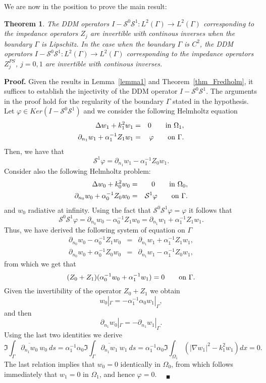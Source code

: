 \documentclass[11pt]{article}
\numberwithin{equation}{section}
\newtheorem{theorem}{Theorem}[section]
\newenvironment{proof}{\hspace{0.5cm} {\bf Proof.}}
{$\quad {}_\blacksquare$\vspace{0.3cm}}
\begin{document}
We are now in the position to prove the main result:
\begin{theorem}\label{thm:wp_DDM}
  The DDM operators $I-\mathcal{S}^0\mathcal{S}^1:L^2(\Gamma)\to L^2(\Gamma)$ corresponding to the impedance operators $Z_j$ are invertible with continous inverses when the boundary $\Gamma$ is Lipschitz. In the case when the boundary $\Gamma$ is $C^2$, the DDM operators $I-\mathcal{S}^0\mathcal{S}^1:L^2(\Gamma)\to L^2(\Gamma)$ corresponding to the impedance operators $Z_j^{PS}$, $j=0,1$ are invertible with continous inverses.
\end{theorem}
\begin{proof}
  Given the results in Lemma~\ref{lemma1} and Theorem~\ref{thm_Fredholm}, it suffices to establish the injectivity of the DDM operator $I-\mathcal{S}^0\mathcal{S}^1$. The arguments in the proof hold for the regularity of the boundary $\Gamma$ stated in the hypothesis. Let $\varphi\in Ker(I-\mathcal{S}^0\mathcal{S}^1)$ and we consider the following Helmholtz equation
  \begin{eqnarray*}
    \Delta w_1+k_1^2w_1&=&0\qquad{\rm in}\ \Omega_1,\\
    \partial_{n_1}w_1+\alpha_1^{-1}Z_1w_1&=&\varphi\qquad{\rm on}\ \Gamma.
  \end{eqnarray*}
  Then, we have that
  \[
  \mathcal{S}^1\varphi=\partial_{n_1}w_1-\alpha_1^{-1}Z_0w_1.
  \]
  Consider also the following Helmholtz problem:
  \begin{eqnarray*}
    \Delta w_0+k_0^2w_0&=&0\qquad{\rm in}\ \Omega_0,\\
    \partial_{n_0}w_0+\alpha_0^{-1}Z_0w_0&=&\mathcal{S}^1\varphi\qquad{\rm on}\ \Gamma.
  \end{eqnarray*}
  and $w_0$ radiative at infinity. Using the fact that $\mathcal{S}^0\mathcal{S}^1\varphi=\varphi$ it  follows that 
  \[
  \mathcal{S}^0\mathcal{S}^1\varphi=\partial_{n_0}w_0-\alpha_0^{-1}Z_1w_0=\partial_{n_1}w_1+\alpha_1^{-1}Z_1w_1.
  \]
  Thus, we have derived the following system of equation on $\Gamma$
  \begin{eqnarray*}
    \partial_{n_0}w_0-\alpha_0^{-1}Z_1w_0&=&\partial_{n_1}w_1+\alpha_1^{-1}Z_1w_1,\\
    \partial_{n_0}w_0+\alpha_0^{-1}Z_0w_0&=&\partial_{n_1}w_1-\alpha_1^{-1}Z_0w_1,
  \end{eqnarray*}
  from which we get that
  \[
  (Z_0+Z_1)(\alpha_0^{-1}w_0+\alpha_1^{-1}w_1)=0\qquad{\rm on}\ \Gamma.
  \]
  Given the invertibility of the operator $Z_0+Z_1$ we obtain
  \[
  w_0|_\Gamma=-\alpha_1^{-1}\alpha_0 w_1|_\Gamma,
  \]
  and then 
  \[
  \partial_{n_1}w_0|_\Gamma=-\partial_{n_1}w_1|_\Gamma.
  \]
  Using the last two identities we derive
  \[
  \Im \int_\Gamma \overline{\partial_{n_1}w_0}\ w_0\ ds=\alpha_1^{-1}\alpha_0 \Im \int_\Gamma \overline{\partial_{n_1}w_1}\ w_1\ ds=\alpha_1^{-1}\alpha_0 \Im\int_{\Omega_1}(|\nabla w_1|^2-k_1^2w_1)dx=0.
  \]
  The last relation implies that $w_0=0$ identically in $\Omega_0$, from which follows immediately that $w_1=0$ in $\Omega_1$, and hence $\varphi=0$. 
  \end{proof}
\end{document}
